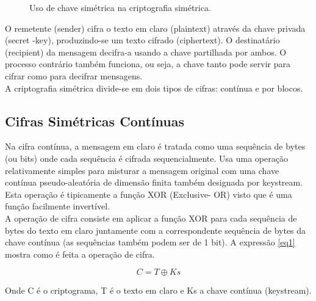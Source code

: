 \documentclass[a4paper,11pt,openright,oneside]{report}
\begin{document}
\begin{figure}[ht]
\center
{}
\caption{Uso de chave simétrica na criptografia simétrica.}
\label{fig:crypto1}
\end{figure}

O remetente (sender) cifra o texto em claro (plaintext) através da chave privada (secret -key), produzindo-se um texto cifrado (ciphertext). O destinatário (recipient) da mensagem decifra-a usando a chave partilhada por ambos. O processo contrário também funciona, ou seja, a chave tanto pode servir para cifrar como para decifrar mensagens.\\

A criptografia simétrica divide-se em dois tipos de cifras: contínua e por blocos.

\subsection{Cifras Simétricas Contínuas}

Na cifra contínua, a mensagem em claro é tratada como uma sequência de bytes (ou bits) onde cada sequência é cifrada sequencialmente. Usa uma operação relativamente simples para misturar a mensagem original com uma chave contínua pseudo-aleatória de dimensão finita também designada por keystream. Esta operação é tipicamente a função XOR (Exclusive- OR) visto que é uma função facilmente invertível.\\

A operação de cifra consiste em aplicar a função XOR para cada sequência de bytes do texto em claro juntamente com a correspondente sequência de bytes da chave contínua (as sequências também podem ser de 1 bit). A expressão \ref{eq1} mostra como é feita a operação de cifra.

\begin{equation}
\label{eq1}
C = T \oplus Ks
\end{equation}

Onde C é o criptograma, T é o texto em claro e Ks a chave contínua (keystream).\\
\end{document}
